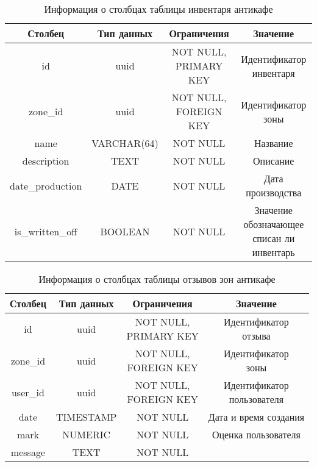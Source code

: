 \begin{table}[H]
	\begin{center}
		\caption{Информация о столбцах таблицы инвентаря антикафе}
		\begin{tabular}{|c|c|c|c|}
			\hline
			Столбец & Тип данных & Ограничения & Значение \\
			\hline
			id & uuid & \makecell{NOT NULL, \\ PRIMARY KEY} & \makecell{Идентификатор \\ инвентаря} \\
			\hline
			zone\_id & uuid & \makecell{NOT NULL, \\ FOREIGN KEY} & \makecell{Идентификатор \\ зоны} \\
			\hline
			name & VARCHAR(64) & NOT NULL & Название \\
			\hline
			description & TEXT & NOT NULL & Описание\\
			\hline
			date\_production & DATE & NOT NULL & Дата производства\\
			\hline
			is\_written\_off & BOOLEAN & NOT NULL & \makecell{Значение \\ обозначающее \\ списан ли \\ инвентарь}\\
			\hline
		\end{tabular}
		\label{table:db:inventories}
	\end{center}
\end{table}

\begin{table}[H]
	\begin{center}
		\caption{Информация о столбцах таблицы отзывов зон антикафе}
		\begin{tabular}{|c|c|c|c|}
			\hline
			Столбец & Тип данных & Ограничения & Значение \\
			\hline
			id & uuid & \makecell{NOT NULL, \\ PRIMARY KEY} & \makecell{Идентификатор \\ отзыва} \\
			\hline
			zone\_id & uuid & \makecell{NOT NULL, \\ FOREIGN KEY} & \makecell{Идентификатор \\ зоны} \\
			\hline
			user\_id & uuid & \makecell{NOT NULL, \\ FOREIGN KEY} & \makecell{Идентификатор \\ пользователя} \\
			\hline
			date & TIMESTAMP & NOT NULL & Дата и время создания \\
			\hline
			mark & NUMERIC & NOT NULL & Оценка пользователя\\
			\hline
			message & TEXT & NOT NULL & \makecell{Комментарий пользователя}\\
			\hline
		\end{tabular}
		\label{table:db:feedbacks}
	\end{center}
\end{table}

